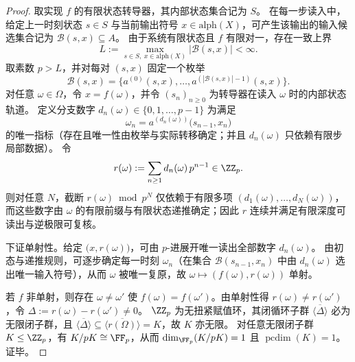 \begin{proof}
取实现 \(f\) 的有限状态转导器，其内部状态集合记为 \(S\)。
在每一步读入中，给定上一时刻状态 \(s\in S\) 与当前输出符号 \(x\in \mathrm{alph}(X)\)，可产生该输出的输入候选集合记为 \(\mathcal B(s,x)\subseteq A\)。
由于系统有限状态且 \(f\) 有限对一，存在一致上界
\[
L:=\max_{s\in S,\ x\in\mathrm{alph}(X)}|\mathcal B(s,x)|<\infty.
\]
取素数 \(p>L\)，并对每对 \((s,x)\) 固定一个枚举
\[
\mathcal B(s,x)=\bigl\{a^{(0)}(s,x),\dots,a^{(|\mathcal B(s,x)|-1)}(s,x)\bigr\}.
\]
对任意 \(\omega\in\Omega\)，令 \(x=f(\omega)\)，并令 \((s_n)_{n\ge 0}\) 为转导器在读入 \(\omega\) 时的内部状态轨道。
定义分支数字 \(d_n(\omega)\in\{0,1,\dots,p-1\}\) 为满足
\[
\omega_n=a^{(d_n(\omega))}\bigl(s_{n-1},x_n\bigr)
\]
的唯一指标（存在且唯一性由枚举与实际转移确定；并且 \(d_n(\omega)\) 只依赖有限步局部数据）。
令
\[
r(\omega):=\sum_{n\ge 1} d_n(\omega)\,p^{n-1}\in\ZZ_p.
\]
则对任意 \(N\)，截断 \(r(\omega)\bmod p^N\) 仅依赖于有限多项 \((d_1(\omega),\dots,d_N(\omega))\)，而这些数字由 \(\omega\) 的有限前缀与有限状态递推确定；因此 \(r\) 连续并满足有限深度可读出与逆极限可复核。
\par
下证单射性。给定 \(\bigl(x,r(\omega)\bigr)\)，可由 \(p\)-进展开唯一读出全部数字 \(d_n(\omega)\)。
由初态与递推规则，可逐步确定每一时刻 \(\omega_n\)（在集合 \(\mathcal B(s_{n-1},x_n)\) 中由 \(d_n(\omega)\) 选出唯一输入符号），从而 \(\omega\) 被唯一复原，故 \(\omega\mapsto (f(\omega),r(\omega))\) 单射。
\par
若 \(f\) 非单射，则存在 \(\omega\neq\omega'\) 使 \(f(\omega)=f(\omega')\)。由单射性得 \(r(\omega)\neq r(\omega')\)，令 \(\Delta:=r(\omega)-r(\omega')\neq 0\)。
\(\ZZ_p\) 为无扭紧赋值环，其闭循环子群 \(\overline{\langle \Delta\rangle}\) 必为无限闭子群，且
\(\overline{\langle \Delta\rangle}\subseteq \overline{\langle r(\Omega)\rangle}=K\)，故 \(K\) 亦无限。
对任意无限闭子群 \(K\le \ZZ_p\)，有 \(K/pK\cong\FF_p\)，从而 \(\dim_{\FF_p}(K/pK)=1\) 且 \(\operatorname{pcdim}(K)=1\)。证毕。
\end{proof}

